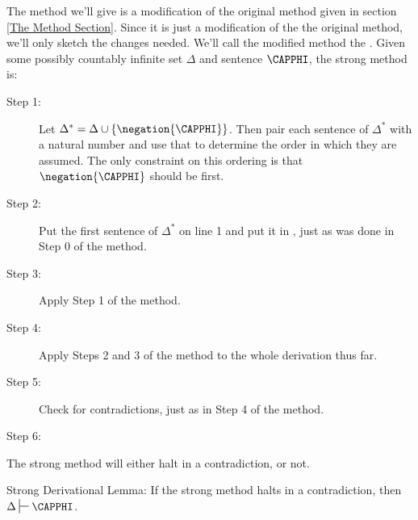 The method we'll give is a modification of the original method given in section \ref{The Method Section}. 
Since it is just a modification of the the original method, we'll only sketch the changes needed. 
We'll call the modified method the . 
Given some possibly countably infinite set $\Delta$ and sentence $\CAPPHI$, the strong method is:
\begin{description}
\item[Step 1:] Let $\Delta^*=\Delta\cup\{\negation{\CAPPHI}\}$. 
Then pair each sentence of $\Delta^*$ with a natural number and use that to determine the order in which they are assumed. 
The only constraint on this ordering is that $\negation{\CAPPHI}$ should be first.

\item[Step 2:] Put the first sentence of $\Delta^*$ on line 1 and put it in , just as was done in Step 0 of the method.

\item[Step 3:] Apply Step 1 of the method.

\item[Step 4:] Apply Steps 2 and 3 of the method to the whole derivation thus far.

\item[Step 5:] Check for contradictions, just as in Step 4 of the method.

\item[Step 6:] \hfill
{}
\end{description}
The strong method will either halt in a contradiction, or not. 
\begin{THEOREM}{ Strong Derivational Lemma:}
If the strong method halts in a contradiction, then $\Delta\sststile{}{}\CAPPHI$.
\end{THEOREM}
